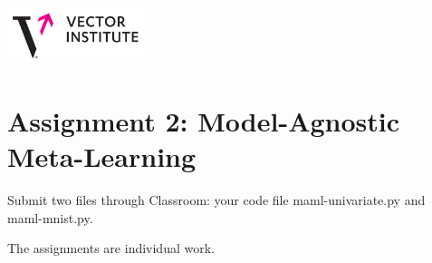 \documentclass[11pt]{article}
\begin{document}
\includegraphics[width=4cm]{vector-logo.png}\newline

\section*{\bf Assignment 2: Model-Agnostic Meta-Learning }



 Submit two files through Classroom: your code file maml-univariate.py and maml-mnist.py.\newline

\noindent The assignments are individual work. 
\end{document}
